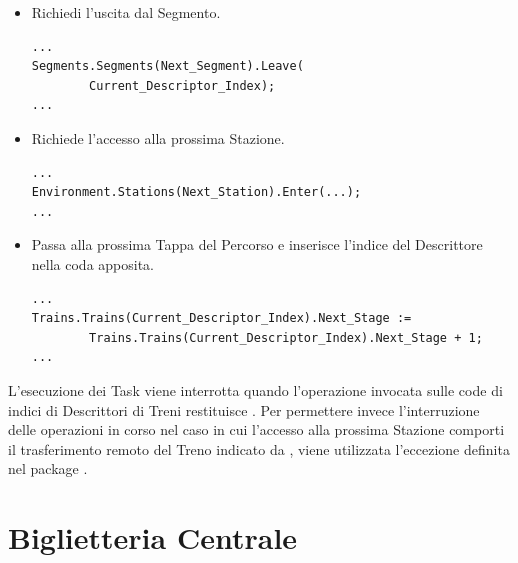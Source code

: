 \begin{itemize}
		\item Richiedi l'uscita dal Segmento. 

\begin{lstlisting}
...
Segments.Segments(Next_Segment).Leave(
		Current_Descriptor_Index);
...
\end{lstlisting}	
	
		\item Richiede l'accesso alla prossima Stazione.

\begin{lstlisting}
...
Environment.Stations(Next_Station).Enter(...);
...
\end{lstlisting}		

		\item Passa alla prossima Tappa del Percorso e inserisce l'indice del Descrittore nella coda apposita.

\begin{lstlisting}
...
Trains.Trains(Current_Descriptor_Index).Next_Stage := 
		Trains.Trains(Current_Descriptor_Index).Next_Stage + 1;
...
\end{lstlisting}

	\end{itemize}
	
	L'esecuzione dei Task viene interrotta quando l'operazione  invocata sulle code di indici di Descrittori di Treni restituisce . Per permettere invece l'interruzione delle operazioni in corso nel caso in cui l'accesso alla prossima Stazione comporti il trasferimento remoto del Treno indicato da , viene utilizzata l'eccezione  definita nel package .
	
	
	
	

	
	
		
	
		
	
		
	
	\newpage
	\section{Biglietteria Centrale}
	
